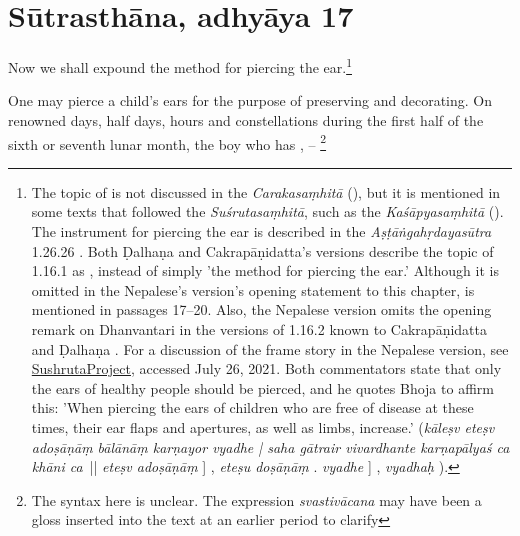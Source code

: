 \section{Sūtrasthāna, adhyāya 17}

\begin{translation}    
    
    \item [1] Now we shall expound the method for piercing the ear.\footnote{The topic of   is not discussed in the \emph{Carakasaṃhitā} (\cite[IB, 326, n.\,175]{meul-hist}), but it is mentioned in some texts that followed the \emph{Suśrutasaṃhitā}, such as the \emph{Kaśāpyasaṃhitā} (\cite[IIA, 30]{meul-hist}). The instrument for piercing the ear is described in the \emph{Aṣṭāṅgahṛdayasūtra} 1.26.26 \citep[153]{kunt-1902}. Both Ḍalhaṇa and Cakrapāṇidatta's versions describe the topic of 1.16.1 \citep[76]{vulgate} as , instead of simply 'the method for piercing the ear.' Although it is omitted in the Nepalese's version's opening statement to this chapter,  is mentioned in passages 17–20. Also, the Nepalese version omits the opening remark on Dhanvantari in the versions of 1.16.2 known to Cakrapāṇidatta \citep[125]{acar-1939} and Ḍalhaṇa \citep[76]{vulgate}. For a discussion of the frame story in the Nepalese version, see \href{sushrutaproject.org/2021/07/11/dhanvantari2/}{SushrutaProject}, accessed July 26, 2021. Both commentators state that only the ears of healthy people should be pierced, and he quotes Bhoja to affirm this: 'When piercing the ears of children who are free of disease at these times, their ear flaps and apertures, as well as limbs, increase.'  (\emph{kāleṣv eteṣv adoṣāṇāṃ bālānāṃ karṇayor vyadhe | saha gātrair vivardhante karṇapālyaś ca khāni ca}~|| \emph{eteṣv adoṣāṇāṃ} ] \cite[76]{vulgate}, \emph{eteṣu doṣāṇāṃ} \cite[125]{acar-1939}. \emph{vyadhe} ] \cite[76]{vulgate}, \emph{vyadhaḥ} \cite[125]{acar-1939}).}
    \item [2] One may pierce a child's ears for the purpose of preserving and 
    decorating. On renowned days, half days, hours and constellations during the first half of the sixth or seventh lunar month, the boy who has , -- \footnote{The
    syntax here is unclear. The expression \emph{svastivācana} may have been
    a gloss inserted into the text at an earlier period to clarify
}
\end{translation}
